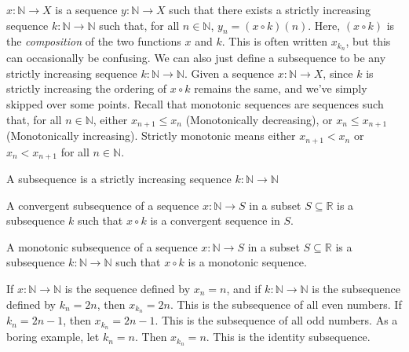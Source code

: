 \documentclass[crop=false,class=book,oneside]{standalone}
\begin{document}
            $x:\mathbb{N}\rightarrow{X}$ is a sequence 
            $y:\mathbb{N}\rightarrow{X}$ such that there exists
            a strictly increasing sequence
            $k:\mathbb{N}\rightarrow\mathbb{N}$ such that, for all
            $n\in\mathbb{N}$, $y_{n}=(x\circ{k})(n)$. Here,
            $(x\circ{k})$ is the \textit{composition} of
            the two functions $x$ and $k$. This is
            often written $x_{k_{n}}$, but this can occasionally
            be confusing. We can also just define a subsequence
            to be any strictly increasing sequence
            $k:\mathbb{N}\rightarrow\mathbb{N}$. Given a sequence
            $x:\mathbb{N}\rightarrow{X}$, since $k$ is strictly
            increasing the ordering of $x\circ{k}$
            remains the same, and we've simply skipped over
            some points. Recall that
            monotonic sequences are sequences such
            that, for all $n\in\mathbb{N}$, either
            $x_{n+1}\leq{x_{n}}$ (Monotonically decreasing),
            or $x_{n}\leq{x_{n+1}}$ (Monotonically increasing).
            Strictly monotonic means either $x_{n+1}<x_{n}$
            or $x_{n}<x_{n+1}$ for all $n\in\mathbb{N}$.
            \begin{definition}
                A subsequence is a strictly increasing sequence
                $k:\mathbb{N}\rightarrow\mathbb{N}$
            \end{definition}
            \begin{definition}
                A convergent subsequence of a sequence
                $x:\mathbb{N}\rightarrow{S}$ in
                a subset $S\subseteq\mathbb{R}$ is a
                subsequence $k$ such that
                $x\circ{k}$ is a convergent sequence in $S$.
            \end{definition}
            \begin{definition}
                A monotonic subsequence of a sequence
                $x:\mathbb{N}\rightarrow{S}$ in a subset
                $S\subseteq\mathbb{R}$ is a subsequence
                $k:\mathbb{N}\rightarrow\mathbb{N}$ such
                that $x\circ{k}$ is a monotonic sequence.
            \end{definition}
            \begin{example}
                If $x:\mathbb{N}\rightarrow\mathbb{N}$ is
                the sequence defined by $x_{n}=n$, and if
                $k:\mathbb{N}\rightarrow\mathbb{N}$ is the
                subsequence defined by
                $k_{n}=2n$, then $x_{k_{n}}=2n$. This is the
                subsequence of all even numbers.
                If $k_{n}=2n-1$, then $x_{k_{n}}=2n-1$. This
                is the subsequence of all odd numbers. As a
                boring example, let $k_{n}=n$. Then
                $x_{k_{n}}=n$. This is the identity subsequence.
            \end{example}
\end{document}
